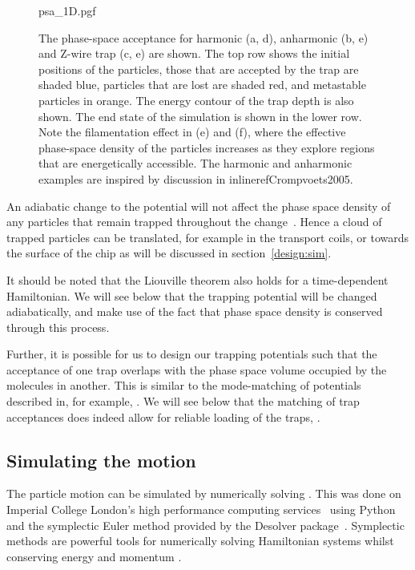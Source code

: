 \begin{figure}[htb]
  \centering
  {psa_1D.pgf}
  \caption{
    The phase-space acceptance for harmonic (a, d), anharmonic (b, e) and
    Z-wire trap (c, e) are shown. The top row shows the initial positions of
    the particles, those that are accepted by the trap are shaded blue,
    particles that are lost are shaded red, and metastable particles in orange.
    The energy contour of the trap depth is also shown. The end state of the
    simulation is shown in the lower row. Note the filamentation effect in (e)
    and (f), where the effective phase-space density of the particles increases
    as they explore regions that are energetically accessible. The harmonic and
    anharmonic examples are inspired by discussion in inlineref{Crompvoets2005}.
  }
  \label{design:fig:psaeg}
\end{figure}

An adiabatic change to the potential will not affect the phase space density of
any particles that remain trapped throughout the change~\cite{Hand1998,
Lichtenberg1969}. Hence a cloud of trapped particles can be translated, for
example in the transport coils, or towards the surface of the chip as will be
discussed in section~\ref{design:sim}.

It should be noted that the Liouville theorem also holds for a time-dependent
Hamiltonian. We will see below that the trapping potential will be changed
adiabatically, and make use of the fact that phase space density is conserved
through this process.

Further, it is possible for us to design our trapping potentials such that the
acceptance of one trap overlaps with the phase space volume occupied by the
molecules in another. This is similar to
the mode-matching of
potentials described in, for example, . We will see below
that the matching of trap acceptances does indeed allow for reliable loading of
the traps, .

\subsection{Simulating the motion}
\label{design:motion:simmethods}


The particle motion can be simulated by numerically solving
. This was done on Imperial College London's high
performance computing services~\cite{ICRCS} using Python~\cite{python} and the
symplectic Euler method provided by the Desolver package~\cite{desolver}.
Symplectic methods are powerful tools for numerically solving Hamiltonian
systems whilst conserving energy and momentum \cite{Hairer2015,
doi:10.1119/1.2034523}. 

